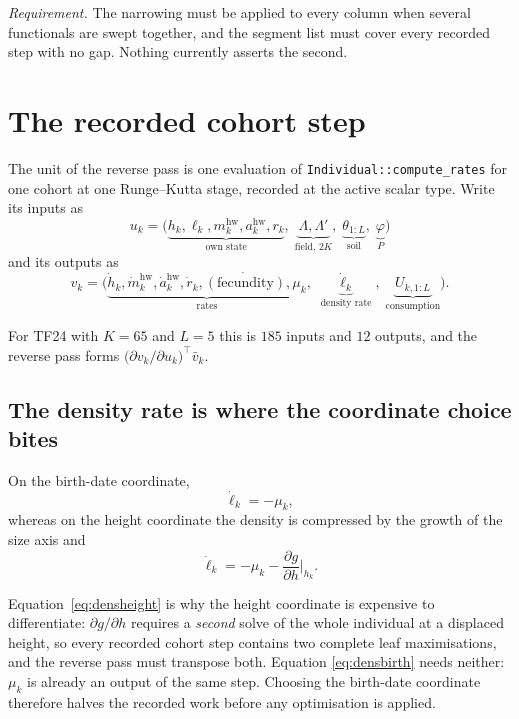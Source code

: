 \documentclass[11pt,a4paper]{article}
\newcommand{\code}[1]{\texttt{\small #1}}
\newcommand{\adj}[1]{\bar{#1}}
\newcommand{\dd}[2]{\frac{\partial #1}{\partial #2}}
\begin{document}
\emph{Requirement.} The narrowing must be applied to every column when several
functionals are swept together, and the segment list must cover every recorded
step with no gap. Nothing currently asserts the second.

\section{The recorded cohort step}
\label{sec:block}

The unit of the reverse pass is one evaluation of
\code{Individual::compute\_rates} for one cohort at one Runge--Kutta stage,
recorded at the active scalar type. Write its inputs as
\begin{equation}
u_k = \big(\underbrace{h_k, \ell_k, m^{\mathrm{hw}}_k, a^{\mathrm{hw}}_k, r_k}_{\text{own state}},\;
\underbrace{\Lambda, \Lambda'}_{\text{field, } 2K},\;
\underbrace{\theta_{1:L}}_{\text{soil}},\;
\underbrace{\varphi}_{P}\big)
\label{eq:blockin}
\end{equation}
and its outputs as
\begin{equation}
v_k = \big(\underbrace{\dot h_k, \dot m^{\mathrm{hw}}_k, \dot a^{\mathrm{hw}}_k, \dot r_k, \dot{(\text{fecundity})}, \mu_k}_{\text{rates}},\;
\underbrace{\dot \ell_k}_{\text{density rate}},\;
\underbrace{U_{k,1:L}}_{\text{consumption}}\big).
\label{eq:blockout}
\end{equation}

For TF24 with $K = 65$ and $L = 5$ this is $185$ inputs and $12$ outputs, and the
reverse pass forms $\big(\partial v_k / \partial u_k\big)^{\!\top} \adj v_k$.

\subsection{The density rate is where the coordinate choice bites}

On the birth-date coordinate,
\begin{equation}
\dot \ell_k = -\mu_k ,
\label{eq:densbirth}
\end{equation}
whereas on the height coordinate the density is compressed by the growth of the
size axis and
\begin{equation}
\dot \ell_k = -\mu_k - \dd{g}{h}\Big|_{h_k} .
\label{eq:densheight}
\end{equation}

Equation~\eqref{eq:densheight} is why the height coordinate is expensive to
differentiate: $\partial g/\partial h$ requires a \emph{second} solve of the whole
individual at a displaced height, so every recorded cohort step contains two
complete leaf maximisations, and the reverse pass must transpose both. Equation
\eqref{eq:densbirth} needs neither: $\mu_k$ is already an output of the same step.
Choosing the birth-date coordinate therefore halves the recorded work before any
optimisation is applied.
\end{document}
